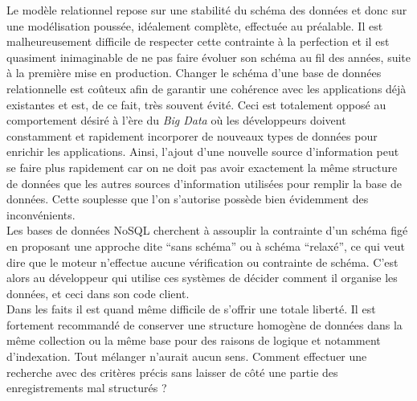 
Le modèle relationnel repose sur une stabilité du schéma des données et donc sur une modélisation poussée, idéalement complète, effectuée au préalable. Il est malheureusement difficile de respecter cette contrainte à la perfection et il est quasiment inimaginable de ne pas faire évoluer son schéma au fil des années, suite à la première mise en production. Changer le schéma d'une base de données relationnelle est coûteux afin de garantir une cohérence avec les applications déjà existantes et est, de ce fait, très souvent évité. Ceci est totalement opposé au comportement désiré à l'ère du \textit{Big Data} où les développeurs doivent constamment et rapidement incorporer de nouveaux types de données pour enrichir les applications. Ainsi, l'ajout d'une nouvelle source d'information peut se faire plus rapidement car on ne doit pas avoir exactement la même structure de données que les autres sources d'information utilisées pour remplir la base de données. Cette souplesse que l'on s'autorise possède bien évidemment des inconvénients.\\

Les bases de données NoSQL cherchent à assouplir la contrainte d'un schéma figé en proposant une approche dite \enquote{sans schéma} ou à schéma \enquote{relaxé}, ce qui veut dire que le moteur n'effectue aucune vérification ou contrainte de schéma. C'est alors au développeur qui utilise ces systèmes de décider comment il organise les données, et ceci dans son code client.\\

Dans les faits il est quand même difficile de s'offrir une totale liberté. Il est fortement recommandé de conserver une structure homogène de données dans la même collection ou la même base pour des raisons de logique et notamment d'indexation. Tout mélanger n'aurait aucun sens. Comment effectuer une recherche avec des critères précis sans laisser de côté une partie des enregistrements mal structurés ?\\

